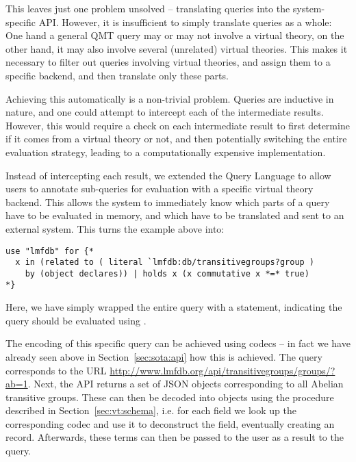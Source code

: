 This leaves just one problem unsolved -- translating queries into the system-specific API. 
However, it is insufficient to simply translate queries as a whole: 
One hand a general QMT query may or may not involve a virtual theory, on the other hand, it may also involve several (unrelated) virtual theories. 
This makes it necessary to filter out queries involving virtual theories, and assign them to a specific backend, and then translate only these parts. 

Achieving this automatically is a non-trivial problem. 
Queries are inductive in nature, and one could attempt to intercept each of the intermediate results. 
However, this would require a check on each intermediate result to first determine if it comes from a virtual theory or not, and then potentially switching the entire evaluation strategy, leading to a computationally expensive implementation. 

Instead of intercepting each result, we extended the Query Language to allow users to annotate sub-queries for evaluation with a specific virtual theory backend. 
This allows the system to immediately know which parts of a query have to be evaluated in \mmt memory, and which have to be translated and sent to an external system. 
This turns the example above into:
\begin{lstlisting}[language=qmt]
use "lmfdb" for {*
  x in (related to ( literal `lmfdb:db/transitivegroups?group ) 
    by (object declares)) | holds x (x commutative x *=* true)
*}
\end{lstlisting}
Here, we have simply wrapped the entire query with a  statement, indicating the query should be evaluated using \lmfdb. 

The encoding of this specific query can be achieved using codecs -- in fact we have already seen above in Section~\ref{sec:sota:api} how this is achieved. 
The query corresponds to the URL \url{http://www.lmfdb.org/api/transitivegroups/groups/?ab=1}. 
Next, the \lmfdb API returns a set of JSON objects corresponding to all Abelian transitive groups. 
These can then be decoded into \ommt objects using the procedure described in Section~\ref{sec:vt:schema}, i.e. for each field we look up the corresponding codec and use it to deconstruct the field, eventually creating an \mmt record. 
Afterwards, these \ommt terms can then be passed to the user as a result to the query. 

